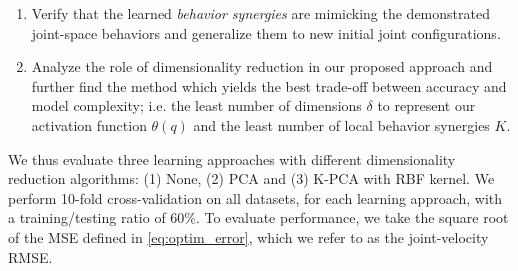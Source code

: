 \documentclass[letterpaper, 10 pt, conference,fleqn]{ieeeconf}
\begin{document}
\begin{enumerate}[leftmargin=*]
\item Verify that the learned \textit{behavior synergies} are mimicking the demonstrated joint-space behaviors and generalize them to new initial joint configurations.
\item Analyze the role of dimensionality reduction in our proposed approach and further find the method which yields the best trade-off between accuracy and model complexity; i.e. the least number of dimensions $\delta$ to represent our activation function $\theta(q)$ and the least number of local behavior synergies $K$.
\end{enumerate}
We thus evaluate three learning approaches with different dimensionality reduction algorithms: (1) None, (2) PCA and (3) K-PCA with RBF kernel.
We perform 10-fold cross-validation on all datasets, for each learning approach, with a training/testing ratio of $60 \%$. To evaluate performance, we take the square root of the MSE defined in \eqref{eq:optim_error}, which we refer to as the joint-velocity RMSE. 
\end{document}

